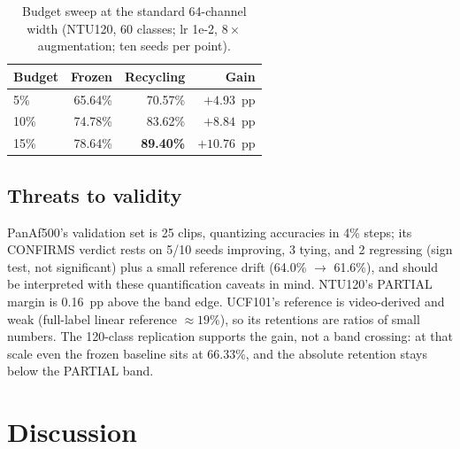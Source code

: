 \documentclass[preprint,12pt,number]{elsarticle}
\begin{document}
\begin{table}[H]
\centering
\caption{Budget sweep at the standard 64-channel width (NTU120, 60 classes;
lr 1e-2, $8\times$ augmentation; ten seeds per point).}
\label{tab:budget64}
\small
\begin{tabular}{@{}lrrr@{}}
\toprule
Budget & Frozen & Recycling & Gain \\
\midrule
5\%  & 65.64\% & 70.57\% & $+4.93$~pp \\
10\% & 74.78\% & 83.62\% & $+8.84$~pp \\
15\% & 78.64\% & \textbf{89.40\%} & $+10.76$~pp \\
\bottomrule
\end{tabular}
\end{table}

\subsection{Threats to validity}

PanAf500's validation set is 25 clips, quantizing accuracies in 4\% steps; its
CONFIRMS verdict rests on 5/10 seeds improving, 3 tying, and 2 regressing
(sign test, not significant) plus a small reference drift (64.0\% $\rightarrow$ 61.6\%),
and should be interpreted with these quantification caveats in mind.
NTU120's PARTIAL margin is 0.16~pp above the band edge. UCF101's reference is
video-derived and weak (full-label linear reference $\approx 19\%$), so its retentions
are ratios of small numbers. The 120-class replication supports the gain, not
a band crossing: at that scale even the frozen baseline sits at 66.33\%,
and the absolute retention stays below the PARTIAL band.

\section{Discussion}
\end{document}
